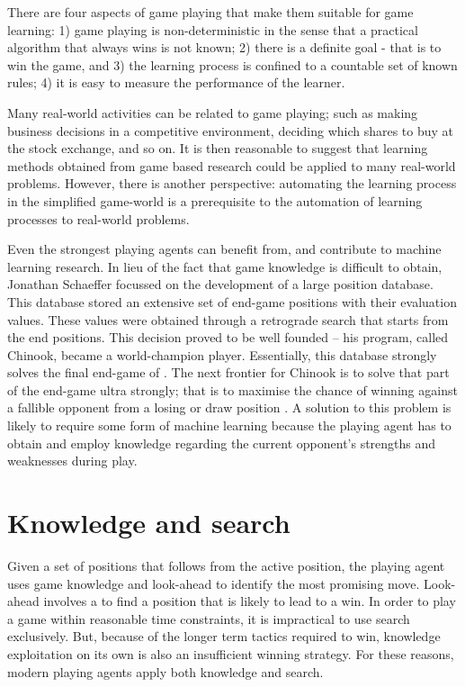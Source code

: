 There are four aspects of game playing that make them suitable for game learning: 1) game playing is non-deterministic in the sense that a practical algorithm that always wins is not known;  2) there is a definite goal - that is to win the game, and 3) the learning process is confined to a countable set of known rules; 4) it is easy to measure the performance of the learner.     

Many real-world activities can be related to game playing; such as making business decisions in a competitive environment, deciding which shares to buy at the stock exchange, and so on.  It is then reasonable to suggest that learning methods obtained from game based research could be applied to many real-world problems.  However, there is another perspective: automating the learning process in the simplified game-world is a prerequisite to the automation of learning processes to real-world problems. 

Even the strongest playing agents can benefit from, and contribute to machine learning research.  In lieu of the fact that game knowledge is difficult to obtain, Jonathan Schaeffer \cite{schaeffer:reexamination} focussed on the development of a large  position database.  This database stored an extensive set of end-game positions with their evaluation values.  These values were obtained through a retrograde search that starts from the end positions. This decision proved to be well founded -- his program, called Chinook, became a world-champion player. Essentially, this database strongly solves the final end-game of . The next frontier for Chinook is to solve that part of the end-game ultra strongly; that is to maximise the chance of winning against a fallible opponent from a losing or draw position \cite{schaeffer:solving}. A solution to this problem is likely to require some form of machine learning because the playing agent has to obtain and employ knowledge regarding the current opponent's strengths and weaknesses during play. 


\section{Knowledge and search}
\label{sec:knowledge-and-search}
Given a set of positions that follows from the active position, the playing agent uses game knowledge and look-ahead to identify the most promising move.  Look- ahead involves a \newline {} to find a position that is likely to lead to a win.  In order to play a game within reasonable time constraints, it is impractical to use search exclusively.  But, because of the longer term tactics required to win, knowledge exploitation on its own is also an insufficient winning strategy.  For these reasons, modern playing agents apply both knowledge and search. 

